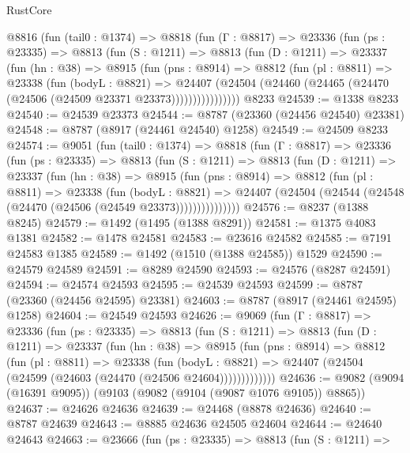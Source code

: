 \begin{lexlean}{RustCore}
\begin{coremodule}
    @8816
      (fun (tail0 : @1374) =>
      @8818
        (fun (Γ : @8817) =>
        @23336
          (fun (ps : @23335) =>
          @8813
            (fun (S : @1211) =>
            @8813
              (fun (D : @1211) =>
              @23337
                (fun (hn : @38) =>
                @8915
                  (fun (pns : @8914) =>
                  @8812
                    (fun (pl : @8811) =>
                    @23338
                      (fun (bodyL : @8821) =>
                      @24407
                        (@24504
                          (@24460 (@24465 (@24470 (@24506 (@24509 @23371 @23373))))))))))))))))
    @8233
@24539 := @1338 @8233
@24540 := @24539 @23373
@24544 := @8787 (@23360 (@24456 @24540) @23381)
@24548 := @8787 (@8917 (@24461 @24540) @1258)
@24549 := @24509 @8233
@24574 := @9051
    (fun (tail0 : @1374) =>
    @8818
      (fun (Γ : @8817) =>
      @23336
        (fun (ps : @23335) =>
        @8813
          (fun (S : @1211) =>
          @8813
            (fun (D : @1211) =>
            @23337
              (fun (hn : @38) =>
              @8915
                (fun (pns : @8914) =>
                @8812
                  (fun (pl : @8811) =>
                  @23338
                    (fun (bodyL : @8821) =>
                    @24407 (@24504 (@24544 (@24548 (@24470 (@24506 (@24549 @23373)))))))))))))))
@24576 := @8237 (@1388 @8245)
@24579 := @1492 (@1495 (@1388 @8291))
@24581 := @1375 @4083 @1381
@24582 := @1478 @24581
@24583 := @23616 @24582
@24585 := @7191 @24583 @1385
@24589 := @1492 (@1510 (@1388 @24585)) @1529
@24590 := @24579 @24589
@24591 := @8289 @24590
@24593 := @24576 (@8287 @24591)
@24594 := @24574 @24593
@24595 := @24539 @24593
@24599 := @8787 (@23360 (@24456 @24595) @23381)
@24603 := @8787 (@8917 (@24461 @24595) @1258)
@24604 := @24549 @24593
@24626 := @9069
    (fun (Γ : @8817) =>
    @23336
      (fun (ps : @23335) =>
      @8813
        (fun (S : @1211) =>
        @8813
          (fun (D : @1211) =>
          @23337
            (fun (hn : @38) =>
            @8915
              (fun (pns : @8914) =>
              @8812
                (fun (pl : @8811) =>
                @23338
                  (fun (bodyL : @8821) =>
                  @24407 (@24504 (@24599 (@24603 (@24470 (@24506 @24604)))))))))))))
@24636 := @9082 (@9094 (@16391 @9095)) (@9103 (@9082 (@9104 (@9087 @1076 @9105)) @8865))
@24637 := @24626 @24636
@24639 := @24468 (@8878 @24636)
@24640 := @8787 @24639
@24643 := @8885 @24636 @24505 @24604
@24644 := @24640 @24643
@24663 := @23666
    (fun (ps : @23335) =>
    @8813
      (fun (S : @1211) =>

\end{coremodule}
\end{lexlean}
